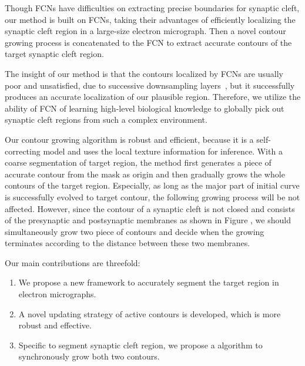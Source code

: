 Though FCNs have difficulties on extracting precise boundaries for synaptic cleft, our method is built on FCNs, taking their advantages of efficiently localizing the synaptic cleft region in a large-size electron micrograph. 
%
Then a novel contour growing process is concatenated to the FCN to extract accurate contours of the target synaptic cleft region.
%

The insight of our method is that the contours localized by FCNs are usually poor and unsatisfied, due to successive downsampling layers~\cite{Chen2017}, but it successfully produces an accurate localization of our plausible region.
%
Therefore, we utilize the ability of FCN of learning high-level biological knowledge to globally pick out synaptic cleft regions from such a complex environment.
%

Our contour growing algorithm is robust and efficient, because it is a self-correcting model and uses the local texture information for inference.
With a coarse segmentation of target region, the method first generates a piece of accurate contour from the mask as origin and then gradually grows the whole contours of the target region.
Especially, as long as the major part of initial curve is successfully evolved to target contour, the following growing process will be not affected.
%
However, since the contour of a synaptic cleft is not closed and consists of the presynaptic and postsynaptic membranes as shown in Figure , we should simultaneously grow two piece of contours and decide when the growing terminates according to the distance between these two membranes.


Our main contributions are threefold:
\begin{enumerate}
	\item We propose a new framework to accurately segment the target region in electron micrographs.
	\item A novel updating strategy of active contours is developed, which is more robust and effective.
	\item Specific to segment synaptic cleft region, we propose a algorithm to synchronously grow both two contours.
\end{enumerate}